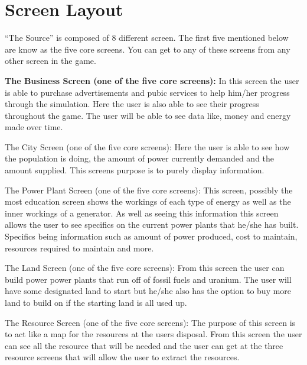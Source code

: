 \documentclass[msc,oneside]{ubcthesis}%
\begin{document}
\section{Screen Layout}
“The Source” is composed of 8 different screen. The first five mentioned below are know as the five core screens. You can get to any of these screens from any other screen in the game. 
\bigskip

\noindent \large \textbf{ The Business Screen (one of the five core screens):} \newline
\indent In this screen the user is able to purchase advertisements and pubic services to help him/her 
progress through the simulation. Here the user is also able to see their progress throughout the game. The 
user will be able to see data like, money and energy made over time.  
\bigskip

\noindent The City Screen (one of the five core screens): \newline
\indent Here the user is able to see how the population is doing, the amount of power currently demanded and the amount supplied. This screens purpose is to purely display information.
\bigskip

\noindent The Power Plant Screen (one of the five core screens): \newline
\indent This screen, possibly the most education screen shows the workings of each type of energy as well as the inner workings of a generator. As well as seeing this information this screen allows the user to 
see specifics on the current power plants that he/she has built. Specifics being information such as 
amount of power produced, cost to maintain, resources required to maintain and more. 
\bigskip

\noindent The Land Screen (one of the five core screens): \newline
\indent From this screen the user can build power power plants that run off of fossil fuels and uranium. The user will have some designated land to start but he/she also has the option to buy more land to build 
on if the starting land is all used up.
\bigskip

\noindent The Resource Screen (one of the five core screens): \newline
\indent The purpose of this screen is to act like a map for the resources at the users disposal. From this 
screen the user can see all the resource that will be needed and the user can get at the three resource 
screens that will allow the user to extract the resources.
\bigskip
\end{document}
